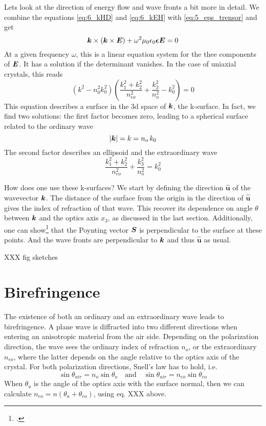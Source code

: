 Lets look at the direction of energy flow and wave fronts a bit more in detail. We combine the  equations  \ref{eq:6_kHD} and  \ref{eq:6_kEH} with \ref{eq:5_eps_trensor} and get
\begin{equation}
    \boldsymbol{k} \times ( \boldsymbol{k} \times \boldsymbol{E}) + \omega^2 \mu_0 \epsilon_0 \boldsymbol{\epsilon} \boldsymbol{E} = 0
\end{equation}
At a given frequency $\omega$, this is a linear equation system for the thee components of $\boldsymbol{E}$. It has a solution if the determinant vanishes. In the case of uniaxial crystals, this reads
\begin{equation}
    (k^2 - n_0^2 k_0^2) \left( \frac{k_1^2 + k_2^2}{n_{eo}^2} + \frac{k_3^2}{n_o^2} - k_0^2  \right) = 0
\end{equation}
This equation describes a surface in the 3d space of $\boldsymbol{k}$, the k-surface. In fact, we find two solutions: the first factor becomes zero, leading to a spherical surface related to  the ordinary wave 
\begin{equation}
    | \boldsymbol{k}| = k = n_o \, k_0
\end{equation}
The second factor describes an ellipsoid and the extraordinary wave
\begin{equation}
    \frac{k_1^2 + k_2^2}{n_{eo}^2} + \frac{k_3^2}{n_o^2} = k_0^2 
\end{equation}



How does one use these k-surfaces? We start by defining the direction $\boldsymbol{\hat{u}}$ of the wavevector $\boldsymbol{k}$. The distance of the surface from the origin in the direction of $\boldsymbol{\hat{u}}$ gives the index of refraction of that wave. This recover its dependence on angle $\theta$ between $\boldsymbol{k}$ and the optics axis $x_3$, as discussed in the last section. Additionally, one can show\footcite{SalehTeich1991} that the Poynting vector $\boldsymbol{S}$ is perpendicular to the surface at these points. And the wave fronts are perpendicular to $\boldsymbol{k}$ and thus $\boldsymbol{\hat{u}}$ as usual.

XXX fig sketches


\section{Birefringence}

The existence of both an ordinary and an extraordinary wave leads to birefringence. A plane wave is diffracted into two different directions when entering an anisotropic material from the air side. Depending on the polarization direction, the wave sees the ordinary index of refraction $n_o$, or the extraordinary $n_{eo}$, where the latter depends on the  angle relative to the optics axis of the crystal. For both polarization directions, Snell's law has to hold, i.e.
\begin{equation}
    \sin \theta_{air} = n_o \sin \theta_o \quad \text{and} \quad   \sin \theta_{air} = n_{eo} \sin \theta_{eo} 
\end{equation}
When $\theta_a$ is the angle of the optics axis with the surface normal, then we can calculate $n_{eo} = n(\theta_a + \theta_{eo})$, using eq. XXX above.

